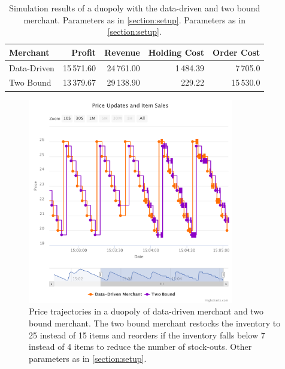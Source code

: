 \begin{table}[t]
	\centering
	\begin{tabular}{lrrrr}
		\toprule
		\textbf{Merchant} & \textbf{Profit} & \textbf{Revenue} & \textbf{Holding Cost} & \textbf{Order Cost} \\
		\midrule
		Data-Driven & 15\,571.60 & 24\,761.00 & 1\,484.39 & 7\,705.0 \\
		Two Bound & 13\,379.67 & 29\,138.90 & 229.22 & 15\,530.0 \\
		\bottomrule
	\end{tabular}
	\caption[Simulation Results: Data-Driven Merchant versus Two Bound Merchant]{Simulation results of a duopoly with the data-driven and two bound merchant. Parameters as in \cref{section:setup}. Parameters as in \cref{section:setup}.}
	\label{tab:duopoly_bound}
\end{table}


\begin{figure}[t]
	\centering
	\includegraphics[width=0.8\textwidth]{figures/duopoly_bound_prices_2}
	\caption[Price Trajectories: Data-Driven Merchant versus Two Bound Merchant with Larger Inventory]{Price trajectories in a duopoly of data-driven merchant and two bound merchant. The two bound merchant restocks the inventory to 25 instead of 15 items and reorders if the inventory falls below 7 instead of 4 items to reduce the number of stock-outs. Other parameters as in \cref{section:setup}.}
	\label{fig:duopoly_bound_prices_2}
\end{figure}

